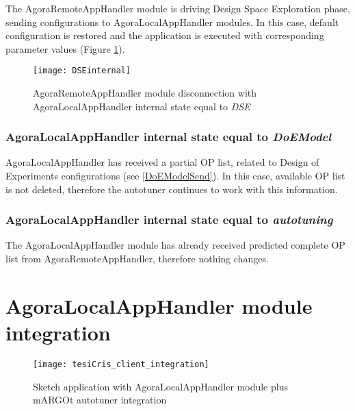 The AgoraRemoteAppHandler module is driving Design Space Exploration phase, sending configurations to AgoraLocalAppHandler modules. In this case, default configuration is restored and the application is executed with corresponding parameter values (Figure \ref{fig::remDiscDSE}).

\begin{figure}[htb]

    \centering
    \texttt{[image: DSEinternal]}

    \caption{AgoraRemoteAppHandler module disconnection with A\-go\-ra\-Local\-App\-Handler internal state equal to \textit{DSE}}

    \label{fig::remDiscDSE}
    
\end{figure}


\subsubsection{AgoraLocalAppHandler internal state equal to \textit{DoEModel}}

AgoraLocalAppHandler has received a partial OP list, related to Design of Experiments configurations (see \ref{DoEModelSend}). In this case, available OP list is not deleted, therefore the autotuner continues to work with this information.


\subsubsection{AgoraLocalAppHandler internal state equal to \textit{autotuning}}

The AgoraLocalAppHandler module has already received predicted complete OP list from AgoraRemoteAppHandler, therefore nothing changes.





\section{AgoraLocalAppHandler module integration}

\begin{figure}[htb]

    \centering
    \texttt{[image: tesiCris\_client\_integration]}

    \caption{Sketch application with AgoraLocalAppHandler module plus mARGOt autotuner integration}

    \label{fig::sketchApp}
    
\end{figure}

